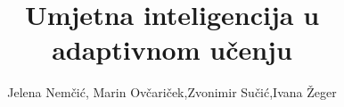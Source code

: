 \documentclass[times, utf8,projekt]{fer}
\begin{document}
	
	
	\title{Umjetna inteligencija u adaptivnom učenju}
	
	\author{Jelena Nemčić, Marin Ovčariček,Zvonimir Sučić,Ivana Žeger}
	
	\maketitle
	\tableofcontents





\end{document}
